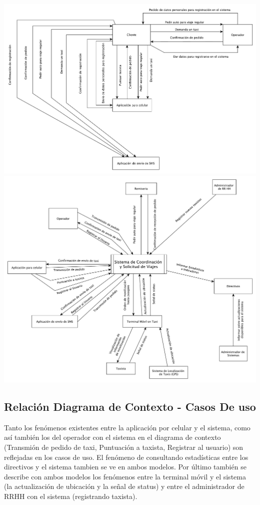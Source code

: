 \documentclass[a4paper]{article}
\begin{document}
\begin{center}
\includegraphics[scale=0.6,angle=90]{diagrama_contexto_1.pdf}
\includegraphics[scale=0.5]{diagrama_contexto_2.pdf}
\end{center}

\subsection{Relaci\'on Diagrama de Contexto - Casos De uso}
Tanto los fen\'omenos existentes entre la aplicaci\'on por celular y el sistema, como as\'i tambi\'en los del operador con el sistema en el diagrama de contexto (Transmi\'on de pedido de taxi, Puntuaci\'on a taxista, Registrar al usuario) son reflejadas en los casos de uso.
El fen\'omeno de consultando estad\'isticas entre los directivos y el sistema tambien se ve en ambos modelos.
Por \'ultimo tambi\'en se describe con ambos modelos los fen\'omenos entre la terminal m\'ovil y el sistema (la actualizaci\'on de ubicaci\'on y la se\~nal de status) y entre el administrador de RRHH con el sistema (registrando taxista).
\end{document}
